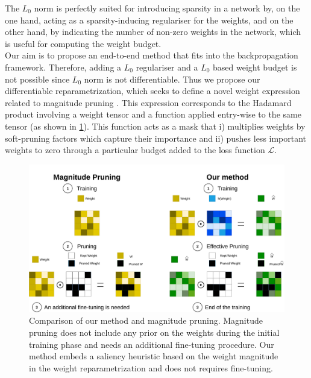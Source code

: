 The $L_0$ norm is perfectly suited for introducing sparsity in a network by, on
the one hand, acting as a sparsity-inducing regulariser for the weights, and on
the other hand, by indicating the number of non-zero weights in the network,
which is useful for computing the weight budget. \\

Our aim is to propose an end-to-end method that fits into the backpropagation
framework. Therefore, adding a $L_0$ regulariser and a $L_0$ based weight budget
is not possible since $L_0$ norm is not differentiable. Thus we propose our
differentiable reparametrization, which seeks to define a novel weight
expression related to magnitude pruning
\cite{DBLP:conf/nips/CunDS89,DBLP:conf/nips/HanPTD15}. This expression
corresponds to the Hadamard product involving a weight tensor and a function
applied entry-wise to the same tensor (as shown in
\cref{fig:chap1:comparison_reparam_vs_mag_pruning}). This function acts as a
mask that i) multiplies weights by soft-pruning factors which capture their
importance and ii) pushes less important weights to zero through a particular
budget added to the loss function $\mathcal{L}$. \\

\begin{figure}[h]
    \centerline{\includegraphics[width=12.5cm]{chapter_1/assets/comparison_reparam_vs_mag_pruning.pdf}}
  \caption{Comparison of our method and magnitude pruning. Magnitude pruning
  does not include any prior on the weights during the initial training phase
  and needs an additional fine-tuning procedure. Our method embeds a saliency
  heuristic based on the weight magnitude in the weight reparametrization and
  does not requires fine-tuning.}
  \label{fig:chap1:comparison_reparam_vs_mag_pruning}
\end{figure}


